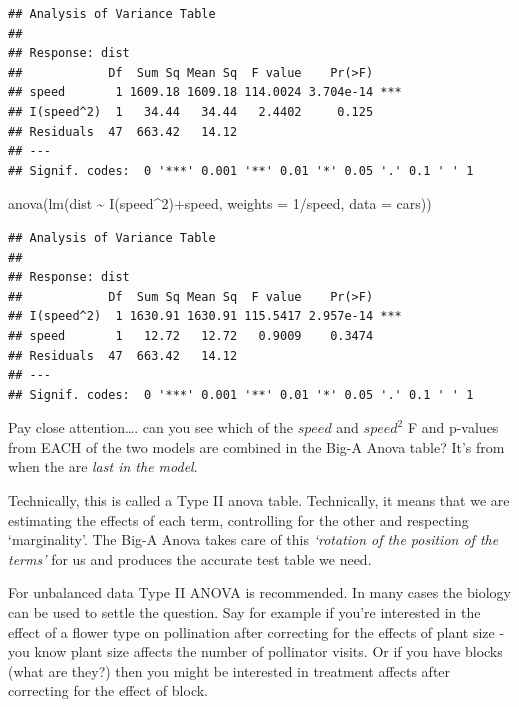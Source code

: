 \documentclass[
]{book}
\newenvironment{Shaded}{\begin{snugshade}}{\end{snugshade}}
\newcommand{\AttributeTok}[1]{\textcolor[rgb]{0.77,0.63,0.00}{#1}}
\newcommand{\DecValTok}[1]{\textcolor[rgb]{0.00,0.00,0.81}{#1}}
\newcommand{\FunctionTok}[1]{\textcolor[rgb]{0.00,0.00,0.00}{#1}}
\newcommand{\NormalTok}[1]{#1}
\newcommand{\SpecialCharTok}[1]{\textcolor[rgb]{0.00,0.00,0.00}{#1}}
\begin{document}
\begin{verbatim}
## Analysis of Variance Table
## 
## Response: dist
##            Df  Sum Sq Mean Sq  F value    Pr(>F)    
## speed       1 1609.18 1609.18 114.0024 3.704e-14 ***
## I(speed^2)  1   34.44   34.44   2.4402     0.125    
## Residuals  47  663.42   14.12                       
## ---
## Signif. codes:  0 '***' 0.001 '**' 0.01 '*' 0.05 '.' 0.1 ' ' 1
\end{verbatim}

\begin{Shaded}
\begin{Highlighting}[]
\FunctionTok{anova}\NormalTok{(}\FunctionTok{lm}\NormalTok{(dist }\SpecialCharTok{\textasciitilde{}} \FunctionTok{I}\NormalTok{(speed}\SpecialCharTok{\^{}}\DecValTok{2}\NormalTok{)}\SpecialCharTok{+}\NormalTok{speed, }\AttributeTok{weights =} \DecValTok{1}\SpecialCharTok{/}\NormalTok{speed, }\AttributeTok{data =}\NormalTok{ cars))}
\end{Highlighting}
\end{Shaded}

\begin{verbatim}
## Analysis of Variance Table
## 
## Response: dist
##            Df  Sum Sq Mean Sq  F value    Pr(>F)    
## I(speed^2)  1 1630.91 1630.91 115.5417 2.957e-14 ***
## speed       1   12.72   12.72   0.9009    0.3474    
## Residuals  47  663.42   14.12                       
## ---
## Signif. codes:  0 '***' 0.001 '**' 0.01 '*' 0.05 '.' 0.1 ' ' 1
\end{verbatim}

Pay close attention\ldots. can you see which of the \(speed\) and \(speed^{2}\) F and p-values from EACH of the two models are combined in the Big-A Anova table? It's from when the are \emph{last in the model}.

Technically, this is called a Type II anova table. Technically, it means that we are estimating the effects of each term, controlling for the other and respecting `marginality'. The Big-A Anova takes care of this \emph{`rotation of the position of the terms'} for us and produces the accurate test table we need.

For unbalanced data Type II ANOVA is recommended. In many cases the biology can be used to settle the question. Say for example if you're interested in the effect of a flower type on pollination after correcting for the effects of plant size - you know plant size affects the number of pollinator visits. Or if you have blocks (what are they?) then you might be interested in treatment affects after correcting for the effect of block.
\end{document}

